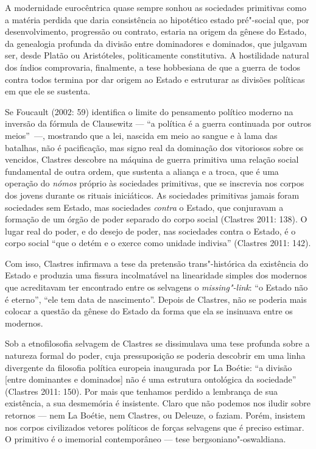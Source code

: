 A modernidade eurocêntrica quase sempre sonhou as sociedades primitivas
como a matéria perdida que daria consistência ao hipotético estado
pré"-social que, por desenvolvimento, progressão ou contrato, estaria na
origem da gênese do Estado, da genealogia profunda da divisão entre
dominadores e dominados, que julgavam ser, desde Platão ou Aristóteles,
politicamente constitutiva. A hostilidade natural dos índios
comprovaria, finalmente, a tese hobbesiana de que a guerra de todos
contra todos termina por dar origem ao Estado e estruturar as divisões
políticas em que ele se sustenta.

Se Foucault (2002: 59) identifica o limite do pensamento político
moderno na inversão da fórmula de Clausewitz --- ``a política é a guerra
continuada por outros meios''~---, mostrando que a lei, nascida em meio
ao sangue e à lama das batalhas, não é pacificação, mas signo real da
dominação dos vitoriosos sobre os vencidos, Clastres descobre na máquina
de guerra primitiva uma relação social fundamental de outra ordem, que
sustenta a aliança e a troca, que é uma operação do \emph{nómos }próprio
às sociedades primitivas, que se inscrevia nos corpos dos jovens durante
os rituais iniciáticos. As sociedades primitivas jamais foram sociedades
sem Estado, mas sociedades \emph{contra }o Estado, que conjuravam a
formação de um órgão de poder separado do corpo social (Clastres 2011:
138). O lugar real do poder, e do desejo de poder, nas sociedades contra
o Estado, é o corpo social ``que o detém e o exerce como unidade
indivisa'' (Clastres 2011: 142).

Com isso, Clastres infirmava a tese da pretensão trans"-histórica da
existência do Estado e produzia uma fissura incolmatável na linearidade
simples dos modernos que acreditavam ter encontrado entre os selvagens o
\emph{missing"-link}: ``o Estado não é eterno'', ``ele tem data de
nascimento''. Depois de Clastres, não se poderia mais colocar a questão
da gênese do Estado da forma que ela se insinuava entre os modernos.

Sob a etnofilosofia selvagem de Clastres se dissimulava uma tese
profunda sobre a natureza formal do poder, cuja pressuposição se poderia
descobrir em uma linha divergente da filosofia política europeia
inaugurada por La Boétie: ``a divisão {[}entre dominantes e dominados{]}
não é uma estrutura ontológica da sociedade'' (Clastres 2011: 150). Por
mais que tenhamos perdido a lembrança de sua existência, a sua
desmemória é insistente. Claro que não podemos nos iludir sobre retornos
--- nem La Boétie, nem Clastres, ou Deleuze, o faziam. Porém, insistem
nos corpos civilizados vetores políticos de forças selvagens que é
preciso estimar. O primitivo é o imemorial contemporâneo --- tese
bergsoniano"-oswaldiana.

